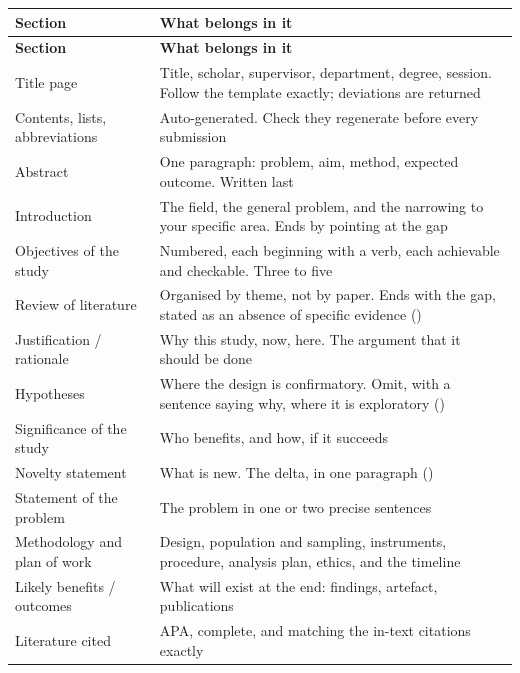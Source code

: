 \begin{center}
\small
\begin{longtable}{@{}L{4.0cm}L{10.3cm}@{}}
\toprule
\textbf{Section} & \textbf{What belongs in it} \\
\midrule
\endfirsthead
\toprule
\textbf{Section} & \textbf{What belongs in it} \\
\midrule
\endhead
\bottomrule
\endfoot
Title page
  & Title, scholar, supervisor, department, degree, session. Follow the
    template exactly; deviations are returned \\
Contents, lists, abbreviations
  & Auto-generated. Check they regenerate before every submission \\
Abstract
  & One paragraph: problem, aim, method, expected outcome. Written last \\
Introduction
  & The field, the general problem, and the narrowing to your specific area.
    Ends by pointing at the gap \\
Objectives of the study
  & Numbered, each beginning with a verb, each achievable and checkable.
    Three to five \\
Review of literature
  & Organised by theme, not by paper. Ends with the gap, stated as an absence
    of specific evidence () \\
Justification / rationale
  & Why this study, now, here. The argument that it should be done \\
Hypotheses
  & Where the design is confirmatory. Omit, with a sentence saying why, where
    it is exploratory () \\
Significance of the study
  & Who benefits, and how, if it succeeds \\
Novelty statement
  & What is new. The delta, in one paragraph () \\
Statement of the problem
  & The problem in one or two precise sentences \\
Methodology and plan of work
  & Design, population and sampling, instruments, procedure, analysis plan,
    ethics, and the timeline \\
Likely benefits / outcomes
  & What will exist at the end: findings, artefact, publications \\
Literature cited
  & APA, complete, and matching the in-text citations exactly \\
\end{longtable}
\end{center}

